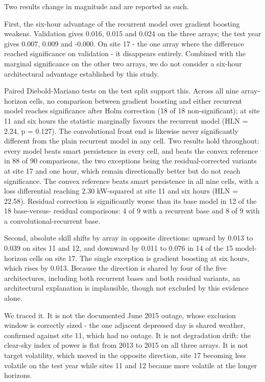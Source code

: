 Two results change in magnitude and are reported as such.

First, the six-hour advantage of the recurrent model over gradient
boosting weakens. Validation gives 0.016, 0.015 and 0.024 on the three
arrays; the test year gives 0.007, 0.009 and -0.000. On site 17 - the
one array where the difference reached significance on validation - it
disappears entirely. Combined with the marginal significance on the
other two arrays, we do not consider a six-hour architectural advantage
established by this study.

Paired Diebold-Mariano tests on the test split support this. Across all
nine array-horizon cells, no comparison between gradient boosting and
either recurrent model reaches significance after Holm correction (18 of
18 non-significant); at site 11 and six hours the statistic marginally
favours the recurrent model (HLN = 2.24, p = 0.127). The convolutional
front end is likewise never significantly different from the plain
recurrent model in any cell. Two results hold throughout: every model
beats smart persistence in every cell, and beats the convex reference in
88 of 90 comparisons, the two exceptions being the residual-corrected
variants at site 17 and one hour, which remain directionally better but
do not reach significance. The convex reference beats smart persistence
in all nine cells, with a loss differential reaching 2.30 kW-squared at
site 11 and six hours (HLN = 22.58). Residual correction is
significantly worse than its base model in 12 of the 18 base-versus-
residual comparisons: 4 of 9 with a recurrent base and 8 of 9 with a
convolutional-recurrent base.

Second, absolute skill shifts by array in opposite directions: upward by
0.013 to 0.039 on sites 11 and 12, and downward by 0.011 to 0.076 in 14
of the 15 model-horizon cells on site 17. The single exception is
gradient boosting at six hours, which rises by 0.013. Because the
direction is shared by four of the five architectures, including both
recurrent bases and both residual variants, an architectural explanation
is implausible, though not excluded by this evidence alone.

We traced it. It is not the documented June 2015 outage, whose exclusion
window is correctly sized - the one adjacent depressed day is shared
weather, confirmed against site 11, which had no outage. It is not
degradation drift: the clear-sky index of power is flat from 2013 to
2015 on all three arrays. It is not target volatility, which moved in
the opposite direction, site 17 becoming less volatile on the test year
while sites 11 and 12 became more volatile at the longer horizons.

